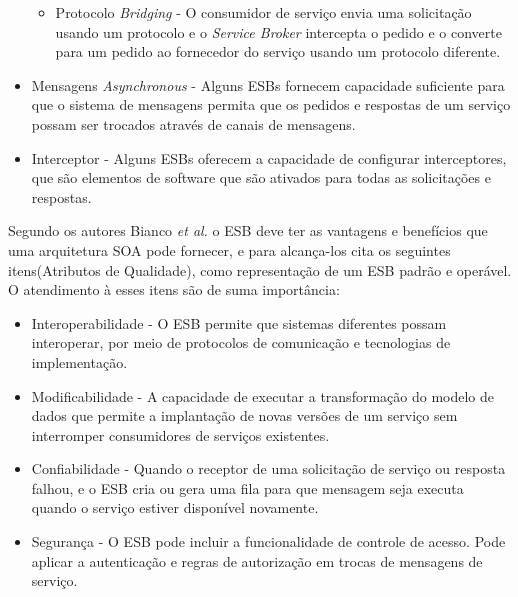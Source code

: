 \begin{itemize}
\begin{itemize}
\item Protocolo \textit{Bridging} - O consumidor de serviço envia uma solicitação usando um protocolo e o \textit{Service Broker} intercepta o pedido e o converte para um pedido ao fornecedor do serviço usando um protocolo diferente.

\end{itemize}

\item Mensagens \textit{Asynchronous} - Alguns \acrshort{ESB}s fornecem capacidade suficiente para que o sistema de mensagens permita que os pedidos e respostas de um serviço possam ser trocados através de canais de mensagens.

\item Interceptor - Alguns \acrshort{ESB}s oferecem a capacidade de configurar interceptores, que são elementos de software que são ativados para todas as solicitações e respostas.

\end{itemize}

Segundo os autores Bianco \textit{et al.} \cite{bianco2011architecting} o \acrshort{ESB} deve ter as vantagens e benefícios que uma arquitetura \acrshort{SOA} pode fornecer,  e para alcança-los cita os seguintes itens(Atributos de Qualidade), como representação de um \acrshort{ESB} padrão e operável. O atendimento à esses itens são de suma importância:

\begin{itemize}

\item Interoperabilidade - O \acrshort{ESB} permite que sistemas diferentes possam interoperar, por meio de protocolos de comunicação e tecnologias de implementação. 

\item Modificabilidade - A capacidade de executar a transformação do modelo de dados que permite a implantação de novas versões de um serviço sem interromper consumidores de serviços existentes. 

\item Confiabilidade - Quando o receptor de uma solicitação de serviço ou resposta falhou, e o ESB cria ou gera uma fila para que mensagem seja executa quando o serviço estiver disponível novamente. 

\item Segurança - O \acrshort{ESB} pode incluir a funcionalidade de controle de acesso. Pode aplicar a autenticação e regras de autorização em trocas de mensagens de serviço.

\end{itemize}

